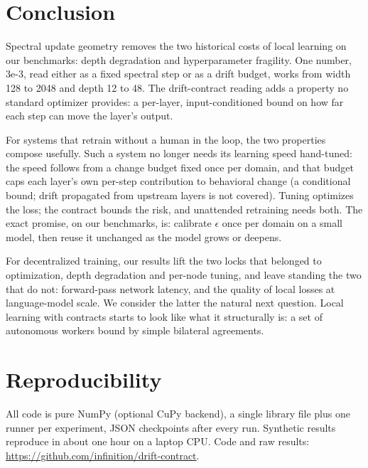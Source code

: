 \documentclass[11pt]{article}
\newcommand{\eps}{\epsilon}
\begin{document}
\section{Conclusion}

Spectral update geometry removes the two historical costs of local learning on our benchmarks: depth degradation and hyperparameter fragility. One number, 3e-3, read either as a fixed spectral step or as a drift budget, works from width 128 to 2048 and depth 12 to 48. The drift-contract reading adds a property no standard optimizer provides: a per-layer, input-conditioned bound on how far each step can move the layer's output.

For systems that retrain without a human in the loop, the two properties compose usefully. Such a system no longer needs its learning speed hand-tuned: the speed follows from a change budget fixed once per domain, and that budget caps each layer's own per-step contribution to behavioral change (a conditional bound; drift propagated from upstream layers is not covered). Tuning optimizes the loss; the contract bounds the risk, and unattended retraining needs both. The exact promise, on our benchmarks, is: calibrate $\eps$ once per domain on a small model, then reuse it unchanged as the model grows or deepens.

For decentralized training, our results lift the two locks that belonged to optimization, depth degradation and per-node tuning, and leave standing the two that do not: forward-pass network latency, and the quality of local losses at language-model scale. We consider the latter the natural next question. Local learning with contracts starts to look like what it structurally is: a set of autonomous workers bound by simple bilateral agreements.

\section*{Reproducibility}

All code is pure NumPy (optional CuPy backend), a single library file plus one runner per experiment, JSON checkpoints after every run. Synthetic results reproduce in about one hour on a laptop CPU. Code and raw results: \url{https://github.com/infinition/drift-contract}.
\end{document}
